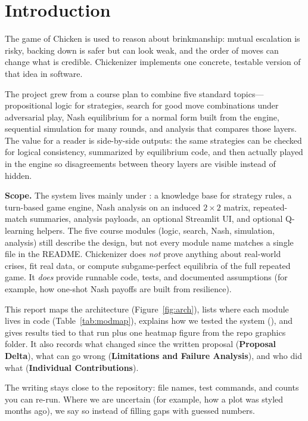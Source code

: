 \section{Introduction}

The game of Chicken is used to reason about brinkmanship: mutual escalation is risky, backing down is safer but can look weak, and the order of moves can change what is credible. Chickenizer implements one concrete, testable version of that idea in software.

The project grew from a course plan to combine five standard topics---propositional logic for strategies, search for good move combinations under adversarial play, Nash equilibrium for a normal form built from the engine, sequential simulation for many rounds, and analysis that compares those layers. The value for a reader is side-by-side outputs: the same strategies can be checked for logical consistency, summarized by equilibrium code, and then actually played in the engine so disagreements between theory layers are visible instead of hidden.

\textbf{Scope.} The system lives mainly under : a knowledge base for strategy rules, a turn-based game engine, Nash analysis on an induced $2\times 2$ matrix, repeated-match summaries, analysis payloads, an optional Streamlit UI, and optional Q-learning helpers. The five course modules (logic, search, Nash, simulation, analysis) still describe the design, but not every module name matches a single file in the README. Chickenizer does \emph{not} prove anything about real-world crises, fit real data, or compute subgame-perfect equilibria of the full repeated game. It \emph{does} provide runnable code, tests, and documented assumptions (for example, how one-shot Nash payoffs are built from resilience).

This report maps the architecture (Figure~\ref{fig:arch}), lists where each module lives in code (Table~\ref{tab:modmap}), explains how we tested the system (), and gives results tied to that run plus one heatmap figure from the repo graphics folder. It also records what changed since the written proposal (\textbf{Proposal Delta}), what can go wrong (\textbf{Limitations and Failure Analysis}), and who did what (\textbf{Individual Contributions}).

The writing stays close to the repository: file names, test commands, and counts you can re-run. Where we are uncertain (for example, how a plot was styled months ago), we say so instead of filling gaps with guessed numbers.
